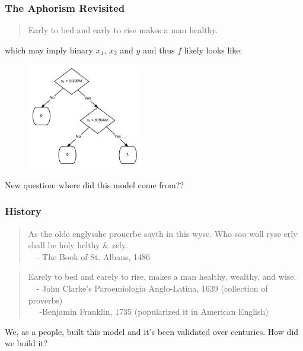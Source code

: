 \documentclass[slides]{beamer} %
\begin{document}
\begin{frame}\frametitle{The Aphorism Revisited}

\small
\begin{quotation}
Early to bed and early to rise makes a man healthy.
\end{quotation}

which may imply binary $x_1$, $x_2$ and $y$ and thus $f$ likely looks like:

\begin{figure}
\centering
\includegraphics[width=2in]{simple_health}
\end{figure}

New question: where did this model come from??
	
\end{frame}

\begin{frame}\frametitle{History}

\begin{quotation}
As the olde englysshe prouerbe sayth in this wyse. Who soo woll ryse erly shall be holy helthy \& zely.\\
~~- The Book of St. Albans, 1486
\end{quotation}
	
\begin{quotation}
Earely to bed and earely to rise, makes a man healthy, wealthy, and wise. \\
~~- John Clarke's Paroemiologia Anglo-Latina, 1639 (collection of proverbs) \\
~~ -Benjamin Franklin, 1735 (popularized it in American English)
\end{quotation}

We, as a people, built this model and it's been validated over centuries. How did we build it?

\end{frame}
\end{document}
